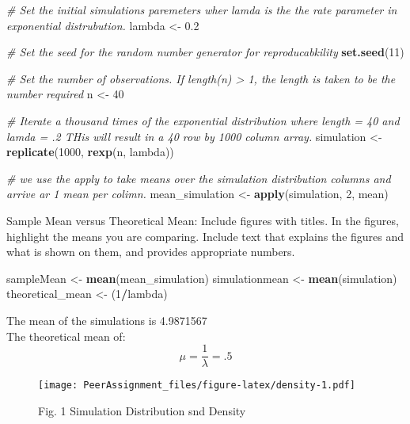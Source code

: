 \documentclass[]{article}
\newenvironment{Shaded}{\begin{snugshade}}{\end{snugshade}}
\newcommand{\CommentTok}[1]{\textcolor[rgb]{0.56,0.35,0.01}{\textit{#1}}}
\newcommand{\DecValTok}[1]{\textcolor[rgb]{0.00,0.00,0.81}{#1}}
\newcommand{\FloatTok}[1]{\textcolor[rgb]{0.00,0.00,0.81}{#1}}
\newcommand{\KeywordTok}[1]{\textcolor[rgb]{0.13,0.29,0.53}{\textbf{#1}}}
\newcommand{\NormalTok}[1]{#1}
\newcommand{\OperatorTok}[1]{\textcolor[rgb]{0.81,0.36,0.00}{\textbf{#1}}}
\newcommand{\StringTok}[1]{\textcolor[rgb]{0.31,0.60,0.02}{#1}}
\begin{document}
\begin{Shaded}
\begin{Highlighting}[]
 \CommentTok{# Set the initial simulations paremeters wher lamda is the the rate parameter in exponential distrubution.}
\NormalTok{  lambda <-}\StringTok{ }\FloatTok{0.2}

\CommentTok{# Set the seed for the random number generator for reproducabkility}
  \KeywordTok{set.seed}\NormalTok{(}\DecValTok{11}\NormalTok{)}

  \CommentTok{# Set the number of observations. If length(n) > 1, the length is taken to be the number required}
\NormalTok{  n <-}\StringTok{ }\DecValTok{40}

  \CommentTok{# Iterate  a thousand times of the exponential distribution where length = 40 and lamda = .2  THis will result in  a 40 row by 1000 column array.}
\NormalTok{  simulation <-}\StringTok{ }\KeywordTok{replicate}\NormalTok{(}\DecValTok{1000}\NormalTok{, }\KeywordTok{rexp}\NormalTok{(n, lambda))}
  
\CommentTok{# we use the apply to take means over the simulation distribution columns and arrive ar 1 mean per colimn.}
\NormalTok{  mean_simulation <-}\StringTok{ }\KeywordTok{apply}\NormalTok{(simulation, }\DecValTok{2}\NormalTok{, mean)}
\end{Highlighting}
\end{Shaded}

Sample Mean versus Theoretical Mean: Include figures with titles. In the
figures, highlight the means you are comparing. Include text that
explains the figures and what is shown on them, and provides appropriate
numbers.

\begin{Shaded}
\begin{Highlighting}[]
\NormalTok{  sampleMean <-}\StringTok{ }\KeywordTok{mean}\NormalTok{(mean_simulation)}
\NormalTok{  simulationmean <-}\StringTok{ }\KeywordTok{mean}\NormalTok{(simulation)}
\NormalTok{  theoretical_mean <-}\StringTok{ }\NormalTok{(}\DecValTok{1}\OperatorTok{/}\NormalTok{lambda)}
\end{Highlighting}
\end{Shaded}

The mean of the simulations is 4.9871567\\
The theoretical mean of: \[\mu = \frac{1}{\lambda}=.5\]

\begin{figure}
\centering
\texttt{[image: PeerAssignment\_files/figure-latex/density-1.pdf]}
\caption{Fig. 1 Simulation Distribution snd Density}
\end{figure}
\end{document}
